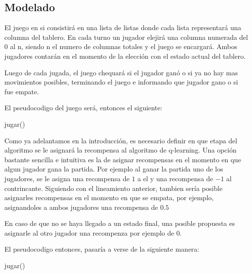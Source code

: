\subsection{Modelado}
El juego en si consistirá en una lista de listas donde cada lista representará una columna del tablero. En cada turno un jugador elejirá una columna numerada del 0 al n, siendo n el numero de columnas totales y el juego se encargará. Ambos jugadores contarán en el momento de la elección con el estado actual del tablero.

Luego de cada jugada, el juego chequará si el jugador ganó o si ya no hay mas movimientos posibles, terminando el juego e informando que jugador gano o si fue empate.

El pseudocodigo del juego será, entonces el siguiente:

\begin{algorithm}[h!]
\begin{algorithmic}[1]\parskip=1mm
 \caption{jugar()}
\end{algorithmic}
\end{algorithm}

Como ya adelantamos en la introducción, es necesario definir en que etapa del algoritmo se le asignará la recompensa al algoritmo de q-learning. Una opción bastante sencilla e intuitiva es la de asignar recompensas en el momento en que algun jugador gana la partida. Por ejemplo al ganar la partida uno de los jugadores, se le asigna una recompensa de $1$ a el y una recompensa de $-1$ al contrincante. Siguiendo con el lineamiento anterior, tambien sería posible asignarles recompensas en el momento en que se empata, por ejemplo, asignandoles a ambos jugadores una recompensa de $0.5$

En caso de que no se haya llegado a un estado final, una posible propuesta es asignarle al otro jugador una recompenza por ejemplo de 0.

El pseudocodigo entonces, pasaría a verse de la siguiente manera:

\begin{algorithm}[h!]
\begin{algorithmic}[1]\parskip=1mm
 \caption{jugar()}
\end{algorithmic}
\end{algorithm}